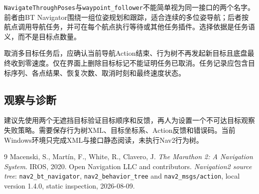 \documentclass[UTF8,zihao=-4]{ctexart}
\begin{document}
\texttt{NavigateThroughPoses}与\texttt{waypoint\_follower}不能简单视为同一接口的两个名字。前者由BT Navigator围绕一组位姿规划和跟踪，适合连续的多位姿导航；后者按航点调用导航任务，并可在每个航点执行等待或其他任务插件。选择依据是任务语义，而不是目标点数量。

取消多目标任务后，应确认当前导航Action结束、行为树不再发起新目标且底盘最终收到零速度。仅在界面上删除目标标记不能证明任务已取消。任务记录应包含目标序列、各点结果、恢复次数、取消时刻和最终速度状态。

\subsection*{观察与诊断}

建议先使用两个无遮挡目标验证目标顺序和反馈，再人为设置一个不可达目标观察失败策略。需要保存行为树XML、目标坐标系、Action反馈和错误码。当前Windows环境只完成XML与接口静态阅读，未执行Nav2行为树。

\begin{thebibliography}{9}
 Macenski, S., Martín, F., White, R., Clavero, J. \emph{The Marathon 2: A Navigation System}. IROS, 2020.
 Open Navigation LLC and contributors. \emph{Navigation2 source tree}: \texttt{nav2\_bt\_navigator}, \texttt{nav2\_behavior\_tree} and \texttt{nav2\_msgs/action}, local version 1.4.0, static inspection, 2026-08-09.
\end{thebibliography}
\end{document}
